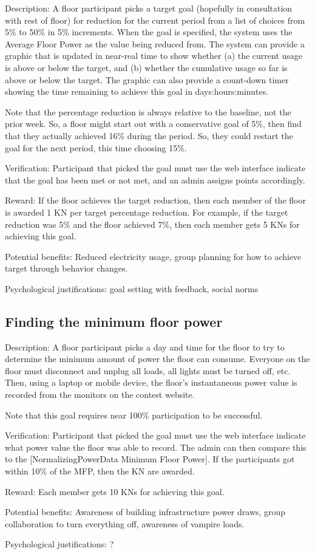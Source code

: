 Description: A floor participant picks a target goal (hopefully in consultation with rest of floor) for reduction for the current period from a list of choices from 5\% to 50\% in 5\% increments.  When the goal is specified, the system uses the Average Floor Power as the value being reduced from.  The system can provide a graphic that is updated in near-real time to show whether (a) the current usage is above or below the target, and (b) whether the cumulative usage so far is above or below the target.  The graphic can also provide a count-down timer showing the time remaining to achieve this goal in days:hours:minutes.

Note that the percentage reduction is always relative to the baseline, not the prior week.  So, a floor might start out with a conservative goal of 5\%, then find that they actually achieved 16\% during the period. So, they could restart the goal for the next period, this time choosing 15\%.

Verification: Participant that picked the goal must use the web interface indicate that the goal has been met or not met, and an admin assigns points accordingly.

Reward: If the floor achieves the target reduction, then each member of the floor is awarded 1 KN per target percentage reduction. For example, if the target reduction was 5\% and the floor achieved 7\%, then each member gets 5 KNs for achieving this goal.

Potential benefits: Reduced electricity usage, group planning for how to achieve target through behavior changes.

Psychological justifications: goal setting with feedback, social norms

\subsection{Finding the minimum floor power}

Description: A floor participant picks a day and time for the floor to try to determine the minimum amount of power the floor can consume. Everyone on the floor must disconnect and unplug all loads, all lights must be turned off, etc. Then, using a laptop or mobile device, the floor's instantaneous power value is recorded from the monitors on the contest website.

Note that this goal requires near 100\% participation to be successful.

Verification: Participant that picked the goal must use the web interface indicate what power value the floor was able to record. The admin can then compare this to the [NormalizingPowerData Minimum Floor Power]. If the participants got within 10\% of the MFP, then the KN are awarded.

Reward: Each member gets 10 KNs for achieving this goal.

Potential benefits: Awareness of building infrastructure power draws, group collaboration to turn everything off, awareness of vampire loads.

Psychological justifications: ?
